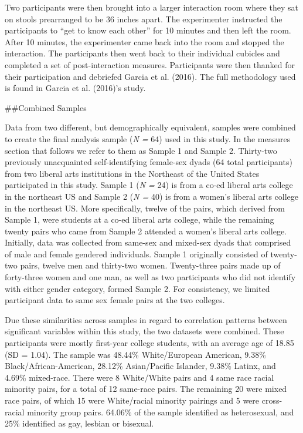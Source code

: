 \documentclass[
  man]{apa6}
\begin{document}
Two participants were then brought into a larger interaction room where they sat on stools prearranged to be 36 inches apart. The experimenter instructed the participants to \enquote{get to know each other} for 10 minutes and then left the room. After 10 minutes, the experimenter came back into the room and stopped the interaction. The participants then went back to their individual cubicles and completed a set of post-interaction measures. Participants were then thanked for their participation and debriefed Garcia et al. (2016). The full methodology used is found in Garcia et al. (2016)'s study.

\#\#Combined Samples

Data from two different, but demographically equivalent, samples were combined to create the final analysis sample (\emph{N =} 64) used in this study. In the measures section that follows we refer to them as Sample 1 and Sample 2. Thirty-two previously unacquainted self-identifying female-sex dyads (64 total participants) from two liberal arts institutions in the Northeast of the United States participated in this study. Sample 1 (\emph{N =} 24) is from a co-ed liberal arts college in the northeast US and Sample 2 (\emph{N =} 40) is from a women's liberal arts college in the northeast US. More specifically, twelve of the pairs, which derived from Sample 1, were students at a co-ed liberal arts college, while the remaining twenty pairs who came from Sample 2 attended a women's liberal arts college. Initially, data was collected from same-sex and mixed-sex dyads that comprised of male and female gendered individuals. Sample 1 originally consisted of twenty-two pairs, twelve men and thirty-two women. Twenty-three pairs made up of forty-three women and one man, as well as two participants who did not identify with either gender category, formed Sample 2. For consistency, we limited participant data to same sex female pairs at the two colleges.

Due these similarities across samples in regard to correlation patterns between significant variables within this study, the two datasets were combined. These participants were mostly first-year college students, with an average age of 18.85 (SD = 1.04). The sample was 48.44\% White/European American, 9.38\% Black/African-American, 28.12\% Asian/Pacific Islander, 9.38\% Latinx, and 4.69\% mixed-race. There were 8 White/White pairs and 4 same race racial minority pairs, for a total of 12 same-race pairs. The remaining 20 were mixed race pairs, of which 15 were White/racial minority pairings and 5 were cross-racial minority group pairs. 64.06\% of the sample identified as heterosexual, and 25\% identified as gay, lesbian or bisexual.
\end{document}
